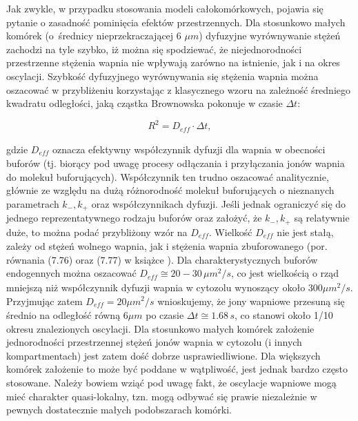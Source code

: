 Jak zwykle, w przypadku stosowania modeli całokomórkowych, pojawia się pytanie o zasadność pominięcia efektów przestrzennych. Dla stosunkowo małych komórek (o~średnicy nieprzekraczającej 6 $\mu m$) dyfuzyjne wyrównywanie stężeń zachodzi na tyle szybko, iż można się spodziewać, że niejednorodności przestrzenne stężenia wapnia nie wpływają zarówno na istnienie, jak i na okres oscylacji. Szybkość dyfuzyjnego wyrównywania się stężenia wapnia można oszacować w przybliżeniu korzystając z klasycznego wzoru na zależność średniego kwadratu odległości, jaką cząstka Brownowska pokonuje w czasie $\Delta t$: 

\medskip
\begin{equation}\label{eq:dystans}
R^2=D_{\textit{eff}} \cdot \Delta t, 
\end{equation}
\medskip

\noindent gdzie $D_{\textit{eff}}$ oznacza efektywny współczynnik dyfuzji dla wapnia w obecności buforów (tj. biorący pod uwagę procesy odłączania i przyłączania jonów wapnia do molekuł buforujących). Współczynnik ten trudno oszacować analitycznie, głównie ze względu na dużą różnorodność molekuł buforujących o nieznanych parametrach $k_{-},k_+$ oraz współczynnikach dyfuzji. Jeśli jednak ograniczyć się do jednego reprezentatywnego rodzaju buforów oraz założyć, że $k_{-},k_+$ są relatywnie duże, to można podać przybliżony wzór na $D_{\textit{eff}}$. Wielkość $D_{\textit{eff}}$ nie jest stałą, zależy od stężeń wolnego wapnia, jak i stężenia wapnia zbuforowanego (por. równania (7.76) oraz (7.77) w książce \cite{Keener2009}). Dla charakterystycznych buforów endogennych można oszacować $D_{\textit{eff}} \cong 20-30 \, \mu m^2/s$, co jest wielkością o rząd mniejszą niż współczynnik dyfuzji wapnia w cytozolu wynoszący około $300 \mu m^2/s$. Przyjmując zatem $D_{\textit{eff}} = 20 \mu m^2/s$ wnioskujemy, że jony wapniowe przesuną się średnio na odległość równą $6 \mu m$ po czasie $\Delta t \cong 1.68\,s$, co stanowi około 1/10 okresu znalezionych oscylacji. Dla stosunkowo małych komórek założenie jednorodności przestrzennej stężeń jonów wapnia w cytozolu (i innych kompartmentach) jest zatem dość dobrze usprawiedliwione. Dla większych komórek założenie to może być poddane w wątpliwość, jest jednak bardzo często stosowane. Należy bowiem wziąć pod uwagę fakt, że oscylacje wapniowe mogą mieć charakter quasi-lokalny, tzn. mogą odbywać się prawie niezależnie w pewnych dostatecznie małych podobszarach komórki. 

